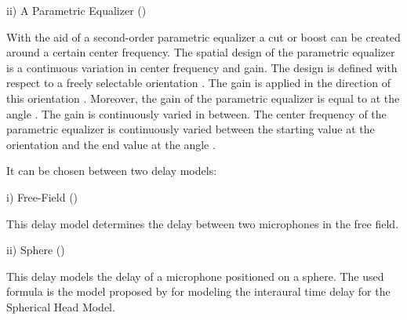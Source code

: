 ii) A Parametric Equalizer ()

With the aid of a second-order parametric equalizer a cut or boost can be created around
a certain center frequency. The spatial design of the parametric equalizer is a continuous
variation in center frequency and gain. The design is defined with respect to a freely
selectable orientation .
The gain  is applied in the direction of this orientation .
Moreover, the gain of the parametric equalizer is equal to  at the angle
. The gain is continuously varied in between.
The center frequency of the parametric equalizer is continuously varied between the starting
value  at the orientation  and the end value
 at the angle .

It can be chosen between two delay models:

i) Free-Field ()

This delay model determines the delay between two microphones in the free field.

ii) Sphere ()

This delay models the delay of a microphone positioned on a sphere. The used formula is
the model proposed by \citet{BrownDuda} for modeling the interaural time delay for the
Spherical Head Model.

